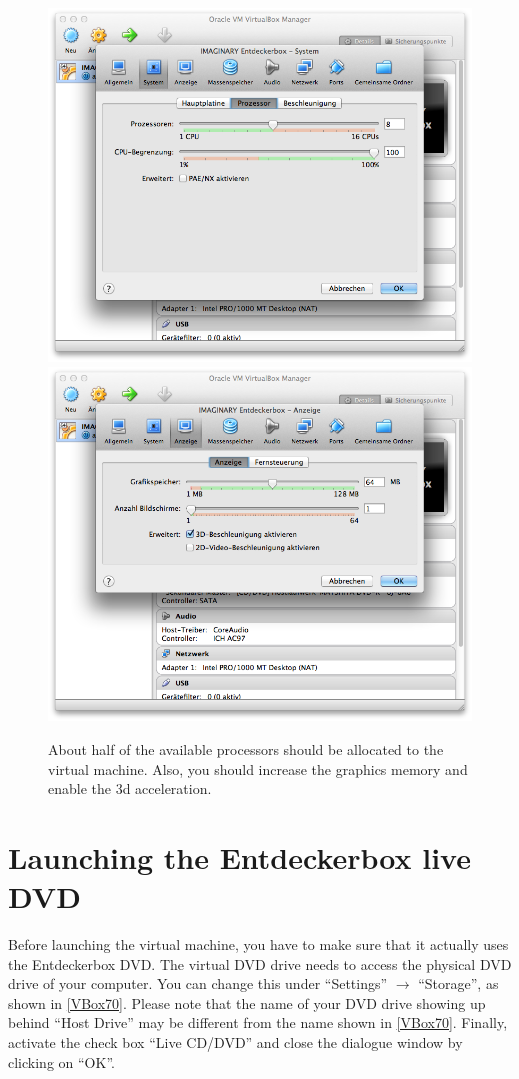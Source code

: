 \documentclass[a4paper,10pt,BCOR=0mm,DIV=14]{scrartcl}
\def\gfxscale{0.27}
\newcommand{\command}[1]{\textsf{\enquote{#1}}}
\begin{document}
\begin{figure}[h]
\centering\includegraphics[scale=\gfxscale]{VBox60}
\qquad\includegraphics[scale=\gfxscale]{VBox61}
\caption{About half of the available processors should be allocated to the virtual machine. Also, you should increase the graphics memory and enable the 3d acceleration.}
\label{VBox60}
\end{figure}

\section{Launching the Entdeckerbox live DVD}
Before launching the virtual machine, you have to make sure that it actually uses the Entdeckerbox DVD. The virtual DVD drive needs to access the physical DVD drive of your computer. You can change this under \command{Settings} $\rightarrow$ \command{Storage}, as shown in \cref{VBox70}. Please note that the name of your DVD drive showing up behind \command{Host Drive} may be different from the name shown in \cref{VBox70}. Finally, activate the check box \command{Live CD/DVD} and close the dialogue window by clicking on \command{OK}.
\end{document}

